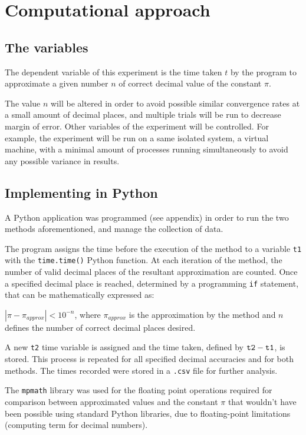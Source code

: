 \section{Computational approach}

\subsection{The variables}
The dependent variable of this experiment is the time taken $t$ by the program
to approximate a given number $n$ of correct decimal value of the constant $\pi$. 

The value $n$ will be altered in order to avoid possible similar convergence rates
at a small amount of decimal places, and multiple trials will be run to decrease
margin of error. Other variables of the experiment will be controlled. For example, the experiment
will be run on a same isolated system, a virtual machine, with a minimal amount of
processes running simultaneously to avoid any possible variance in results. 


\subsection{Implementing in Python}

A Python application was programmed (see appendix) in order to run the two
methods aforementioned, and manage the collection of data.

The program assigns the time before the execution of the method to a variable \verb|t1|
with the \verb|time.time()| Python function. At each iteration of the method, the number of valid decimal
places of the resultant approximation are counted. Once a specified decimal place is reached,
determined by a programming \verb|if| statement, that can be mathematically expressed as:

$| \pi - \pi_{approx} | < 10^{-n}$, where $\pi_{approx}$ is the approximation by the method and 
$n$ defines the number of correct decimal places desired.


A new \verb|t2| time variable is assigned and the time taken, defined by $\verb|t2| - \verb|t1|$, is stored. This process is repeated for all specified decimal accuracies and
for both methods. The times recorded were stored in a \verb|.csv| file for further analysis.

The \verb|mpmath| library was used for the floating point operations required
for comparison between approximated values and the constant $\pi$ that wouldn't
have been possible using standard Python libraries, due to floating-point limitations (computing 
term for decimal numbers). \cite{mpmath}